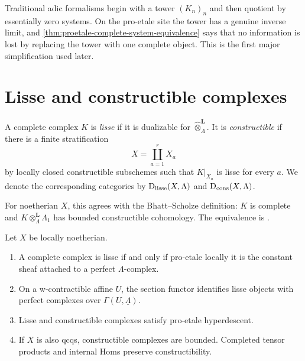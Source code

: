 \begin{proetalebox}
Traditional adic formalisms begin with a tower
\((K_n)_n\) and then quotient by essentially zero systems.  On the pro-etale
site the tower has a genuine inverse limit, and
\cref{thm:proetale-complete-system-equivalence} says that no information is
lost by replacing the tower with one complete object.  This is the first
major simplification used later.
\end{proetalebox}

\section{Lisse and constructible complexes}

\begin{definition}
\label{def:proetale-lisse-constructible}
A complete complex \(K\) is \emph{lisse} if it is dualizable for
\(\widehat\otimes^{\mathbf L}_{\Lambda}\).  It is \emph{constructible} if
there is a finite stratification
\[
  X=\coprod_{a=1}^r X_a
\]
by locally closed constructible subschemes such that \(K|_{X_a}\) is lisse
for every \(a\).  We denote the corresponding categories by
\(\mathrm D_{\mathrm{lisse}}(X,\Lambda)\) and \(\mathrm D_{\mathrm{cons}}(X,\Lambda)\).
\end{definition}

For noetherian \(X\), this agrees with the Bhatt--Scholze definition:
\(K\) is complete and \(K\otimes^{\mathbf L}_{\Lambda}\Lambda_1\) has bounded
constructible cohomology.  The equivalence is
\cite[Definition~6.5.1, Lemma~6.5.3, and Proposition~6.6.11]
{BhattScholzeProEtale}.

\begin{theorem}
\label{thm:proetale-constructible-characterization}
Let \(X\) be locally noetherian.
\begin{enumerate}
\item A complete complex is lisse if and only if pro-etale locally it is the
      constant sheaf attached to a perfect \(\Lambda\)-complex.
\item On a w-contractible affine \(U\), the section functor identifies lisse
      objects with perfect complexes over
      \(\Gamma(U,\underline\Lambda)\).
\item Lisse and constructible complexes satisfy pro-etale hyperdescent.
\item If \(X\) is also qcqs, constructible complexes are bounded.  Completed
      tensor products and internal Homs preserve constructibility.
\end{enumerate}
\end{theorem}

